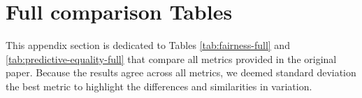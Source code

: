 
\FloatBarrier
\section{Full comparison Tables}

This appendix section is dedicated to Tables \ref{tab:fairness-full} and \ref{tab:predictive-equality-full} that compare all metrics provided in the original paper.
Because the results agree across all metrics, we deemed standard deviation the best metric to highlight the differences and similarities in variation.




